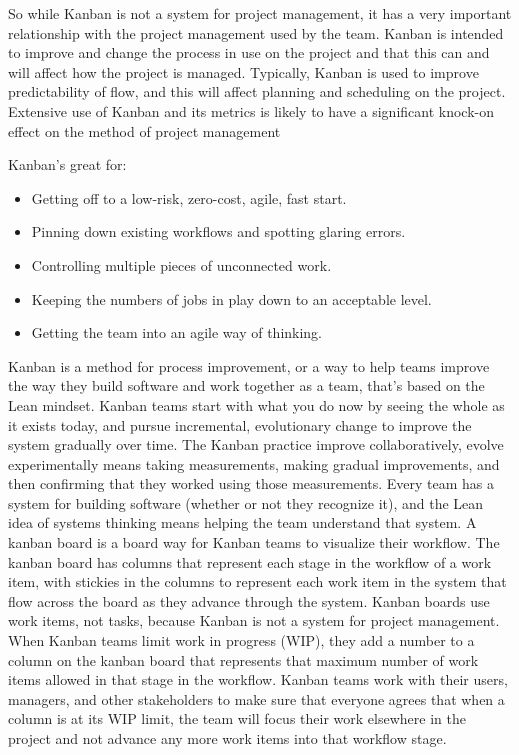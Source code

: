 So while Kanban is not a system for project management, it has a very important
relationship with the project management used by the team. Kanban is intended to
improve and change the process in use on the project and that this can and will affect
how the project is managed. Typically, Kanban is used to improve predictability of
flow, and this will affect planning and scheduling on the project. Extensive use of
Kanban and its metrics is likely to have a significant knock-on effect on the method
of project management

Kanban's great for:
\begin{itemize}
    \item Getting off to a low-risk, zero-cost, agile, fast start.
    \item Pinning down existing workflows and spotting glaring errors.
    \item Controlling multiple pieces of unconnected work.
    \item Keeping the numbers of jobs in play down to an acceptable level.
    \item Getting the team into an agile way of thinking.
\end{itemize}

Kanban is a method for process improvement, or a way to help
teams improve the way they build software and work together as
a team, that's based on the Lean mindset.
Kanban teams start with what you do now by seeing the whole as
it exists today, and pursue incremental, evolutionary change to
improve the system gradually over time.
The Kanban practice improve collaboratively, evolve experimentally means taking
measurements, making gradual improvements, and then confirming that they worked
using those measurements.
Every team has a system for building software (whether or not
they recognize it), and the Lean idea of systems thinking means
helping the team understand that system.
A kanban board is a board way for Kanban teams to visualize
their workflow.
The kanban board has columns that represent each stage in the
workflow of a work item, with stickies in the columns to represent each work
item in the system that flow across the board as they advance through the
system.
Kanban boards use work items, not tasks, because Kanban is not
a system for project management.
When Kanban teams limit work in progress (WIP), they add a
number to a column on the kanban board that represents that
maximum number of work items allowed in that stage in the
workflow.
Kanban teams work with their users, managers, and other stakeholders to make
sure that everyone agrees that when a column is at its WIP limit, the team will
focus their work elsewhere in the project and not advance any more work items
into that workflow stage.

